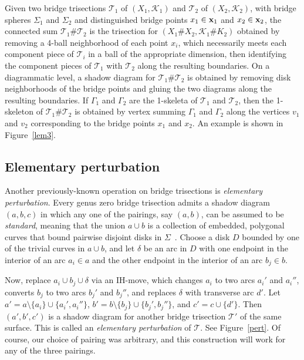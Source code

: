 \documentclass[11pt, oneside]{amsart}
\theoremstyle{theorem}
\theoremstyle{definition}
\newcommand{\K}{\mathcal{K}}
\newcommand{\T}{\mathcal{T}}
\theoremstyle{theorem}
\begin{document}
Given two bridge trisections $\T_1$ of $(X_1,\K_1)$ and $\T_2$ of $(X_2,\K_2)$, with bridge spheres $\Sigma_1$ and $\Sigma_2$ and distinguished bridge points $x_1 \in \bold x_1$ and $x_2 \in \bold x_2$, the connected sum $\T_1 \# \T_2$ is the trisection for $(X_1 \# X_2, \K_1 \# K_2)$ obtained by removing a 4-ball neighborhood of each point $x_i$, which necessarily meets each component piece of $\T_i$ in a ball of the appropriate dimension, then identifying the component pieces of $\T_1$ with $\T_2$ along the resulting boundaries.  On a diagrammatic level, a shadow diagram for $\T_1 \# \T_2$ is obtained by removing disk neighborhoods of the bridge points and gluing the two diagrams along the resulting boundaries.  If $\Gamma_1$ and $\Gamma_2$ are the 1-skeleta of $\T_1$ and $\T_2$, then the 1-skeleton of $\T_1 \# \T_2$ is obtained by vertex summing $\Gamma_1$ and $\Gamma_2$ along the vertices $v_1$ and $v_2$ corresponding to the bridge points $x_1$ and $x_2$.  An example is shown in Figure~\ref{lem3}.

\subsection{Elementary perturbation}

Another previously-known operation on bridge trisections is \emph{elementary perturbation}.  Every genus zero bridge trisection admits a shadow diagram $(a,b,c)$ in which any one of the pairings, say $(a,b)$, can be assumed to be \emph{standard}, meaning that the union $a \cup b$ is a collection of embedded, polygonal curves that bound pairwise disjoint disks in $\Sigma$~\cite{MZB1}.  Choose a disk $D$ bounded by one of the trivial curves in $a\cup b$, and let $\delta$ be an arc in $D$ with one endpoint in the interior of an arc $a_i \in a$ and the other endpoint in the interior of an arc $b_j \in b$.

Now, replace $a_i \cup b_j \cup \delta$ via an IH-move, which changes $a_i$ to two arcs $a_i'$ and $a_i''$, converts $b_j$ to two arcs $b_j'$ and $b_j''$, and replaces $\delta$ with transverse arc $d'$.  Let $a' = a \setminus \{a_i\} \cup \{a_i',a_i''\}$, $b' = b \setminus \{b_j\} \cup \{b_j',b_j''\}$, and $c' = c \cup \{d'\}$.  Then $(a',b',c')$ is a shadow diagram for another bridge trisection $\T'$ of the same surface.  This is called an \emph{elementary perturbation} of $\T$.  See Figure~\ref{pert}.  Of course, our choice of pairing was arbitrary, and this construction will work for any of the three pairings.
\end{document}
